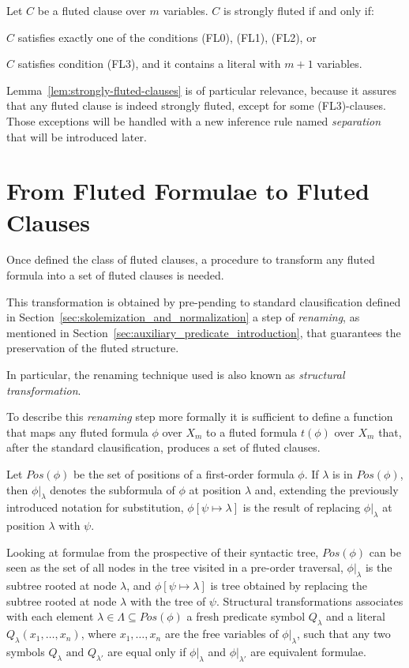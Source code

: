 \begin{lemma}\label{lem:strongly-fluted-clauses}
  Let \(C\) be a fluted clause over \(m\) variables. \(C\) is strongly fluted if and only if:
  \begin{enumerate*}[label= (\roman*)]
    \item \(C\) satisfies exactly one of the conditions (FL0), (FL1), (FL2), or
    \item \(C\) satisfies condition (FL3), and it contains a literal with \(m+1\) variables.
  \end{enumerate*}
\end{lemma}

Lemma~\ref{lem:strongly-fluted-clauses} is of particular relevance, because it assures that any fluted clause is indeed strongly fluted, except for some (FL3)-clauses. Those exceptions will be handled with a new inference rule named \emph{separation} that will be introduced later.

\section{From Fluted Formulae to Fluted Clauses}

Once defined the class of fluted clauses, a procedure to transform any fluted formula into a set of fluted clauses is needed.

This transformation is obtained by pre-pending to standard clausification defined in Section~\ref{sec:skolemization_and_normalization} a step of \emph{renaming}, as mentioned in Section~\ref{sec:auxiliary_predicate_introduction}, that guarantees the preservation of the fluted structure.

In particular, the renaming technique used is also known as \emph{structural transformation}.

To describe this \emph{renaming} step more formally it is sufficient to define a function that maps any fluted formula \(\phi\) over \(X_m\) to a fluted formula \(t(\phi)\) over \(X_m\) that, after the standard clausification, produces a set of fluted clauses.

Let \(Pos(\phi)\) be the set of positions of a first-order formula \(\phi\). If \(\lambda\) is in \(Pos(\phi)\), then \(\phi|_\lambda\) denotes the subformula of \(\phi\) at position \(\lambda\) and, extending the previously introduced notation for substitution, \(\phi[\psi\mapsto\lambda]\) is the result of replacing \(\phi|_\lambda\)  at position \(\lambda\) with \(\psi\).

Looking at formulae from the prospective of their syntactic tree, \(Pos(\phi)\) can be seen as the set of all nodes in the tree visited in a pre-order traversal, \(\phi|_\lambda\) is the subtree rooted at node \(\lambda\), and \(\phi[\psi\mapsto\lambda]\) is tree obtained by replacing the subtree rooted at node \(\lambda\) with the tree of \(\psi\).
Structural transformations associates with each element \(\lambda \in \Lambda \subseteq Pos(\phi)\) a fresh predicate symbol \(Q_\lambda\) and a literal \(Q_\lambda(x_1,\ldots,x_n)\), where \(x_1,\ldots,x_n\) are the free variables of \(\phi|_\lambda\), such that any two symbols \(Q_\lambda \text{ and } Q_{\lambda'}\) are equal only if \(\phi|_\lambda\) and \(\phi|_{\lambda'}\) are equivalent formulae.

